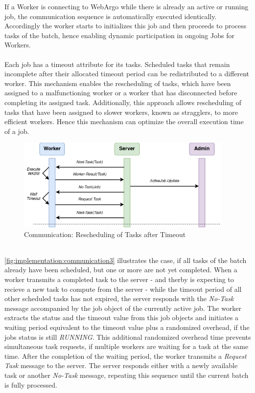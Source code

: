 If a Worker is connecting to WebArgo while there is already an active or running job, the communication sequence is automatically executed identically. Accordingly the worker starts to initializes this job and then proceeds to process tasks of the batch, hence enabling dynamic participation in ongoing Jobs for Workers.
\\~\\
Each job has a timeout attribute for its tasks. Scheduled tasks that remain incomplete after their allocated timeout period can be redistributed to a different worker. This mechanism enables the rescheduling of tasks, which have been assigned to a malfunctioning worker or a worker that has disconnected before completing its assigned task. Additionally, this approach allows rescheduling of tasks that have been assigned to slower workers, known as stragglers, to more efficient workers. Hence this mechanism can optimize the overall execution time of a job.
\begin{figure}[htbp]
    \centering
    \includegraphics[width=0.95\textwidth]{gfx/figures/communication-timeout.png}
    \caption{Communication: Rescheduling of Tasks after Timeout}
    \label{fig:implementation:communication3}
\end{figure}
~\\
\autoref{fig:implementation:communication3} illustrates the case, if all tasks of the batch already have been scheduled, but one or more are not yet completed. When a worker transmits a completed task to the server - and therby is expecting to recieve a new task to compute from the server - while the timeout period of all other scheduled tasks has not expired, the server responds with the \emph{No-Task} message accompanied by the job object of the currently active job. The worker extracts the status and the timeout value from this job objects and initiates a waiting period equivalent to the timeout value plus a randomized overhead, if the jobs status is still \emph{RUNNING}. This additional randomized overhead time prevents simultaneous task requests, if multiple workers are waiting for a task at the same time. After the completion of the waiting period, the worker transmits a \emph{Request Task} message to the server. The server responds either with a newly available task or another \emph{No-Task} message, repeating this sequence until the current batch is fully processed.

